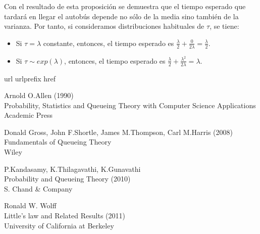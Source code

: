 \documentclass[a4paper,10pt]{scrartcl}
\theoremstyle{definition}
\numberwithin{equation}{section}
\begin{document}
	Con el resultado de esta proposición se demuestra que el tiempo esperado que tardará en llegar el autobús depende no sólo de la media sino también de la varianza. Por tanto, si consideramos distribuciones habituales de $\tau$, se tiene:
	\begin{itemize}
		\item Si $\tau=\lambda$ constante, entonces, el tiempo esperado es $\frac{\lambda}{2} + \frac{0}{2\lambda} = \frac{\lambda}{2}$.
		\item Si $\tau \sim exp(\lambda)$, entonces, el tiempo esperado es $\frac{\lambda}{2} + \frac{\lambda^2}{2\lambda} = \lambda$.
	\end{itemize}
	
	
	\newpage
	\begin{thebibliography}{10}
		\expandafter\ifx\csname url\endcsname\relax
		\def\url#1{\texttt{#1}}\fi
		\expandafter\ifx\csname urlprefix\endcsname\relax\def\urlprefix{URL }\fi
		\expandafter\ifx\csname href\endcsname\relax
		\def\href#1#2{#2} \def\path#1{#1}\fi
		
		Arnold O.Allen (1990)\\
		Probability, Statistics and Queueing Theory with Computer Science Applications\\
		Academic Press
		
		Donald Gross, John F.Shortle, James M.Thompson, Carl M.Harris (2008)\\
		Fundamentals of Queueing Theory\\
		Wiley
		
		P.Kandasamy, K.Thilagavathi, K.Gunavathi\\
		Probability and Queueing Theory (2010)\\
		S. Chand \& Company
		
		Ronald W. Wolff\\
		Little's law and Related Results (2011)\\
		University of California at Berkeley
	\end{thebibliography}
	
\end{document}
